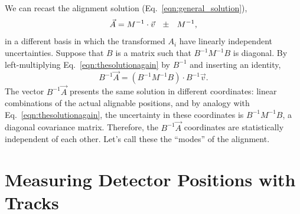 \documentclass[12pt]{article}
\begin{document}
We can recast the alignment solution (Eq.~\ref{eqn:general_solution}), 
\begin{equation}
\vec{A} = M^{-1} \cdot \vec{v} \hspace{0.25 cm} \pm \hspace{0.25 cm} M^{-1},
\label{eqn:thesolutionagain}
\end{equation}
in a different basis in which the transformed $A_i$ have linearly
independent uncertainties.  Suppose that $B$ is a matrix such that
$B^{-1} M^{-1} B$ is diagonal.  By left-multiplying
Eq.~\ref{eqn:thesolutionagain} by $B^{-1}$ and inserting an identity,
\begin{equation}
B^{-1} \vec{A} = \left( B^{-1} M^{-1} B \right) \cdot B^{-1} \vec{v}.
\end{equation}
The vector $B^{-1} \vec{A}$ presents the same solution in different
coordinates: linear combinations of the actual alignable positions,
and by analogy with Eq.~\ref{eqn:thesolutionagain}, the uncertainty in
these coordinates is $B^{-1} M^{-1} B$, a diagonal covariance matrix.
Therefore, the $B^{-1} \vec{A}$ coordinates are statistically
independent of each other.  Let's call these the ``modes'' of the
alignment.






\section{Measuring Detector Positions with Tracks}
\label{sec:measuring_detector_positions_with_tracks}

\end{document}
